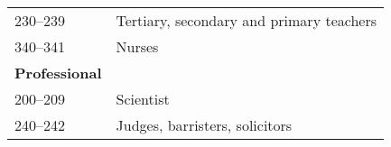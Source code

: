 \documentclass[a4paper,11pt,titlepage]{article}
\begin{document}
\begin{table}[hb]
\begin{tabular}{ll}
230--239 & Tertiary, secondary and primary teachers \\
340--341 & Nurses \\
\textbf{Professional}\\
200--209 & Scientist \\
240--242 & Judges, barristers, solicitors \\
\bottomrule
\end{tabular}
\end{table}

\clearpage

\end{document}
